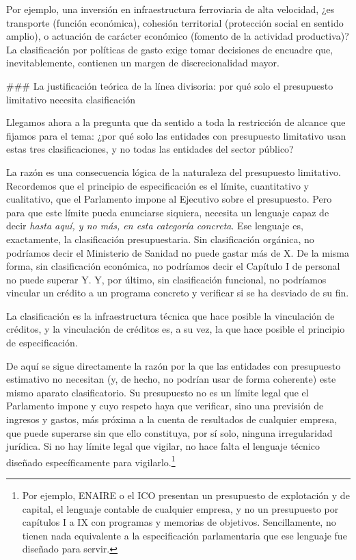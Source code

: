 \documentclass[10pt,a4paper]{article}
\begin{document}
Por ejemplo, una inversión en infraestructura ferroviaria de alta velocidad, ¿es transporte (función económica), cohesión territorial (protección social en sentido amplio), o actuación de carácter económico (fomento de la actividad productiva)? La clasificación por políticas de gasto exige tomar decisiones de encuadre que, inevitablemente, contienen un margen de discrecionalidad mayor.

### La justificación teórica de la línea divisoria: por qué solo el presupuesto limitativo necesita clasificación

Llegamos ahora a la pregunta que da sentido a toda la restricción de alcance que fijamos para el tema: ¿por qué solo las entidades con presupuesto limitativo usan estas tres clasificaciones, y no todas las entidades del sector público? 

La razón es una consecuencia lógica de la naturaleza del presupuesto limitativo. Recordemos que el principio de especificación es el límite, cuantitativo y cualitativo, que el Parlamento impone al Ejecutivo sobre el presupuesto. Pero para que este límite pueda enunciarse siquiera, necesita un lenguaje capaz de decir \textit{hasta aquí, y no más, en esta categoría concreta}. Ese lenguaje es, exactamente, la clasificación presupuestaria. Sin clasificación orgánica, no podríamos decir el Ministerio de Sanidad no puede gastar más de X. De la misma forma, sin clasificación económica, no podríamos decir el Capítulo I de personal no puede superar Y. Y, por último, sin clasificación funcional, no podríamos vincular un crédito a un programa concreto y verificar si se ha desviado de su fin. 

La clasificación es la infraestructura técnica que hace posible la vinculación de créditos, y la vinculación de créditos es, a su vez, la que hace posible el principio de especificación.

De aquí se sigue directamente la razón por la que las entidades con presupuesto estimativo no necesitan (y, de hecho, no podrían usar de forma coherente) este mismo aparato clasificatorio. Su presupuesto no es un límite legal que el Parlamento impone y cuyo respeto haya que verificar, sino una previsión de ingresos y gastos, más próxima a la cuenta de resultados de cualquier empresa, que puede superarse sin que ello constituya, por sí solo, ninguna irregularidad jurídica. Si no hay límite legal que vigilar, no hace falta el lenguaje técnico diseñado específicamente para vigilarlo.\footnote{%
    Por ejemplo, ENAIRE o el ICO presentan un presupuesto de explotación y de capital, el lenguaje contable de cualquier empresa, y no un presupuesto por capítulos I a IX con programas y memorias de objetivos. Sencillamente, no tienen nada equivalente a la especificación parlamentaria que ese lenguaje fue diseñado para servir.
}
\end{document}
